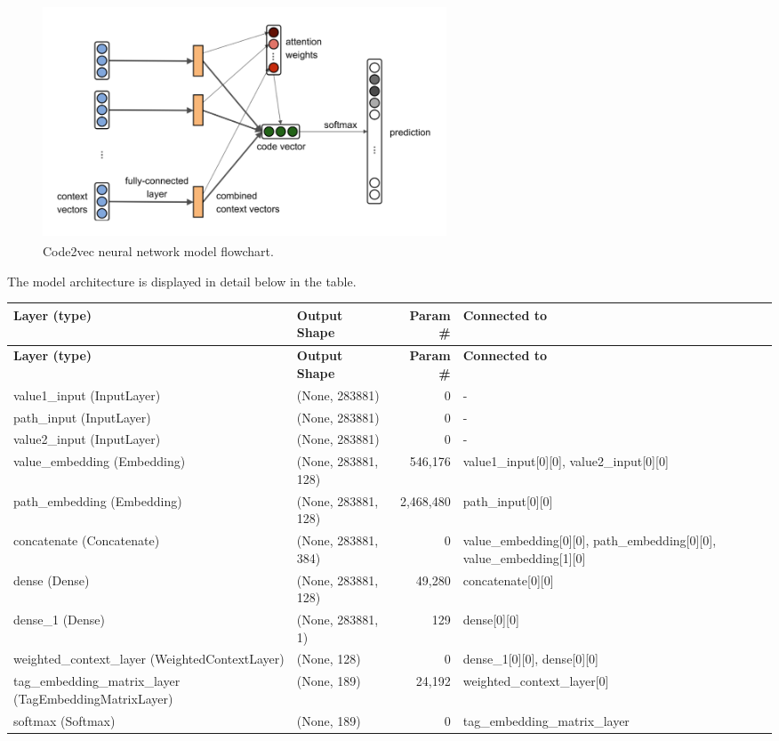 \documentclass[10pt,english,a4paper]{report}
\begin{document}
\begin{figure}[H]
    \centering
    \includegraphics[width=12cm, height=7cm]{figures/code2vec_model_visual.png}
    \caption{Code2vec \cite{code2vec} neural network model flowchart.}
    \label{fig:code2vec_model_visual}
\end{figure}


The model architecture is displayed in detail below in the table.
\begin{longtable}{|p{4cm}|p{5cm}|r|p{4cm}|}
    \hline
    \textbf{Layer (type)} & \textbf{Output Shape} & \textbf{Param \#} & \textbf{Connected to} \\
    \hline
    \endfirsthead
    \hline
    \textbf{Layer (type)} & \textbf{Output Shape} & \textbf{Param \#} & \textbf{Connected to} \\
    \hline
    \endhead
    value1\_input (InputLayer) & (None, 283881) & 0 & - \\
    \hline
    path\_input (InputLayer) & (None, 283881) & 0 & - \\
    \hline
    value2\_input (InputLayer) & (None, 283881) & 0 & - \\
    \hline
    value\_embedding (Embedding) & (None, 283881, 128) & 546,176 & value1\_input[0][0], value2\_input[0][0] \\
    \hline
    path\_embedding (Embedding) & (None, 283881, 128) & 2,468,480 & path\_input[0][0] \\
    \hline
    concatenate (Concatenate) & (None, 283881, 384) & 0 & value\_embedding[0][0], path\_embedding[0][0], value\_embedding[1][0] \\
    \hline
    dense (Dense) & (None, 283881, 128) & 49,280 & concatenate[0][0] \\
    \hline
    dense\_1 (Dense) & (None, 283881, 1) & 129 & dense[0][0] \\
    \hline
    weighted\_context\_layer (WeightedContextLayer) & (None, 128) & 0 & dense\_1[0][0], dense[0][0] \\
    \hline
    tag\_embedding\_matrix\_layer (TagEmbeddingMatrixLayer) & (None, 189) & 24,192 & weighted\_context\_layer[0] \\
    \hline
    softmax (Softmax) & (None, 189) & 0 & tag\_embedding\_matrix\_layer \\
    \hline
    \end{longtable}
    
\end{document}

